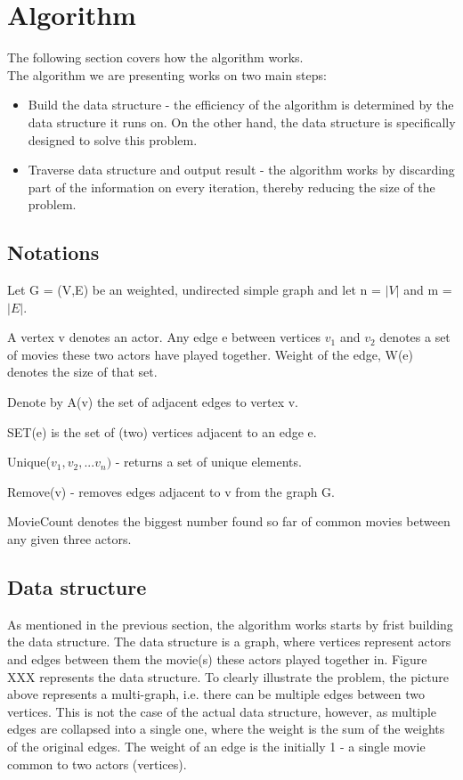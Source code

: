 \label{Algorithm}
\section{Algorithm}

The following section covers how the algorithm works.
\\
The algorithm we are presenting works on two main steps:
\begin{itemize}
  \item Build the data structure - the efficiency of the algorithm is determined by the data structure it runs on. On the other hand, the data structure is specifically designed to solve this problem.
  \item Traverse data structure and output result - the algorithm works by  discarding part of the information on every iteration, thereby reducing the size of the problem.
\end{itemize} 

\subsection{Notations}
Let G = (V,E) be an weighted, undirected simple graph and let n = \(\lvert V\rvert\) and m = \(\lvert E\rvert\).

A vertex v denotes an actor. Any edge e between vertices \(v_1\) and \(v_2\) denotes a set of movies these two actors have played together. Weight of the edge, W(e) denotes the size of that set.

Denote by A(v) the set of adjacent edges to vertex v.

SET(e) is the set of (two) vertices adjacent to an edge e.

Unique(\(v_1, v_2,... v_n)\) - returns a set of unique elements.

Remove(v) - removes edges adjacent to v from the graph G.

MovieCount denotes the biggest number found so far of common movies between any given three actors.

\subsection{Data structure}
As mentioned in the previous section, the algorithm works starts by frist building the data structure. The data structure is a graph, where vertices represent actors and edges between them the movie(s) these actors played together in. Figure XXX represents the data structure.\vspace*{3\baselineskip}
To clearly illustrate the problem, the picture above represents a multi-graph, i.e. there can be multiple edges between two vertices. This is not the case of the actual data structure, however, as multiple edges are collapsed into a single one, where the weight is the sum of the weights of the original edges. The weight of an edge is the initially 1 - a single movie common to two actors (vertices).

